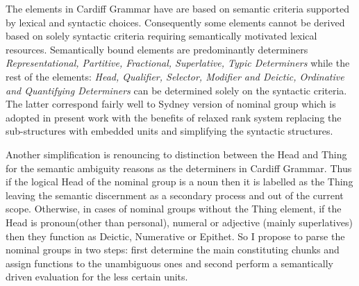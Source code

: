 	The elements in Cardiff Grammar have are based on semantic criteria supported by lexical and syntactic choices. Consequently some elements cannot be derived based on solely syntactic criteria requiring semantically motivated lexical resources. Semantically bound elements are predominantly determiners \textit{Representational, Partitive, Fractional, Superlative, Typic Determiners} while the rest of the elements: \textit{Head, Qualifier, Selector, Modifier and Deictic, Ordinative and Quantifying Determiners} can be determined solely on the syntactic criteria. The latter correspond fairly well to Sydney version of nominal group which is adopted in present work with the  benefits of relaxed rank system replacing the sub-structures with embedded units and simplifying the syntactic structures. 
	
	
	Another simplification is renouncing to distinction between the Head and Thing \citep[390--396]{Halliday2013} for the semantic ambiguity reasons as the determiners in Cardiff Grammar. Thus if the logical Head of the nominal group is a noun then it is labelled as the Thing leaving the semantic discernment as a secondary process and out of the current scope. Otherwise, in cases of nominal groups without the Thing element, if the Head is pronoun(other than personal), numeral or adjective (mainly superlatives) then they function as Deictic, Numerative or Epithet. So I propose to parse the nominal groups in two steps: first determine the main constituting chunks and assign functions to the unambiguous ones and second perform a semantically driven evaluation for the less certain units.
	
